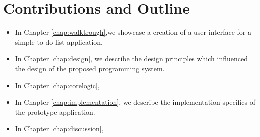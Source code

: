 \section* {Contributions and Outline}
\begin{itemize}
	\item In Chapter \ref{chap:walktrough},we showcase a creation of a user interface for a simple to-do list application.
	\item In Chapter \ref{chap:design}, we describe the design principles which influenced the design of the proposed programming system.
	\item In Chapter \ref{chap:corelogic}, 
	\item In Chapter \ref{chap:implementation}, we describe the implementation specifics of the prototype application.
	\item In Chapter \ref{chap:discussion}, 
\end{itemize}
